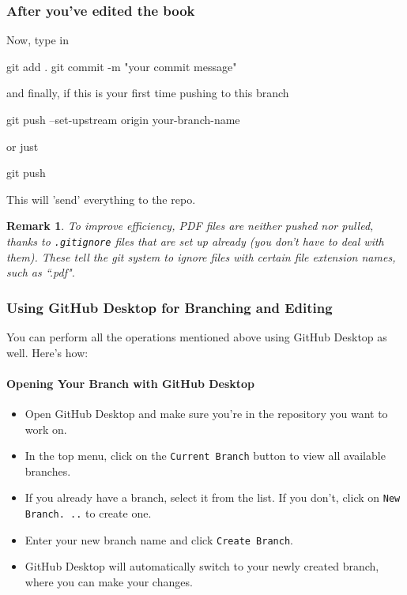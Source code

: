 \documentclass{article}
\newtheorem{remark}{Remark}
\begin{document}
    \subsubsection{After you've edited the book}
    Now, type in
    \begin{bashcode}
        git add .
        git commit -m "your commit message"
    \end{bashcode}
    and finally, if this is your first time pushing to this branch
    \begin{bashcode}
        git push --set-upstream origin your-branch-name
    \end{bashcode}
    or just
    \begin{bashcode}
        git push
    \end{bashcode}
    This will 'send' everything to the repo.
    \begin{remark}
        To improve efficiency, PDF files are neither pushed nor pulled, thanks to \texttt{.gitignore} files that are set up already (you don't have to deal with them).
        These tell the git system to ignore files with certain file extension names, such as ``.pdf".
    \end{remark}

    \subsubsection{Using GitHub Desktop for Branching and Editing}

    You can perform all the operations mentioned above using GitHub Desktop as well.
    Here's how:

    \paragraph{Opening Your Branch with GitHub Desktop}

    \begin{itemize}
        \item Open GitHub Desktop and make sure you're in the repository you want to work on.
        \item In the top menu, click on the \texttt{Current Branch} button to view all available branches.
        \item If you already have a branch, select it from the list.
              If you don't, click on \texttt{New Branch.
                  ..} to create one.
        \item Enter your new branch name and click \texttt{Create Branch}.
        \item GitHub Desktop will automatically switch to your newly created branch, where you can make your changes.
    \end{itemize}
\end{document}
